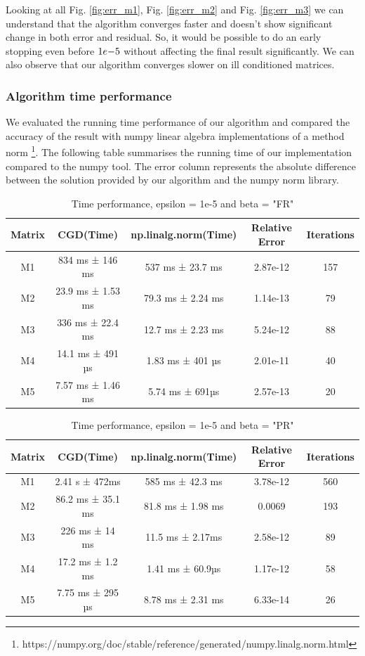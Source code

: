 \documentclass{article}
\numberwithin{equation}{section}
\begin{document}
Looking at all Fig. \ref{fig:err_m1}, Fig. \ref{fig:err_m2} and Fig. \ref{fig:err_m3} we can understand that the algorithm converges faster and doesn't show significant change in both error and residual. So, it would be possible to do an early stopping even before $1e\-{-5}$ without affecting the final result significantly. We can also observe that our algorithm converges slower on ill conditioned matrices.
\subsubsection{Algorithm time performance}
We evaluated the running time performance of our algorithm and compared the accuracy of the result with numpy linear algebra implementations of a method norm \footnote{https://numpy.org/doc/stable/reference/generated/numpy.linalg.norm.html}. The following table summarises the running time of our implementation compared to the numpy tool. The error column represents the absolute difference between the solution provided by our algorithm and the numpy norm library.

\begin{table}[hbt!]
    \centering
    \begin{tabular}{||c c c c c||}
 \hline
 Matrix & CGD(Time) & np.linalg.norm(Time) & Relative Error & Iterations \\ [0.8ex] 
 \hline\hline
 M1 & 834 ms ± 146 ms & 537 ms ± 23.7 ms & 2.87e-12 & 157 \\
 
 \hline
 M2 & 23.9 ms ± 1.53 ms & 79.3 ms ± 2.24 ms & 1.14e-13 & 79\\
 \hline
 M3 & 336 ms ± 22.4 ms & 12.7 ms ± 2.23 ms & 5.24e-12 & 88 \\
 \hline
 M4 & 14.1 ms ± 491 µs & 1.83 ms ± 401 µs & 2.01e-11 & 40 \\
 \hline
 M5 & 7.57 ms ± 1.46 ms & 5.74 ms ± 691µs & 2.57e-13 & 20 \\
 \hline
\end{tabular}
    \caption{Time performance, epsilon = 1e-5 and beta = "FR"}
    \label{tab:fr_table}
\end{table}


\begin{table}[hbt!]
    \centering
    \begin{tabular}{||c c c c c||}
 \hline
 Matrix & CGD(Time) & np.linalg.norm(Time) & Relative Error & Iterations \\ [0.8ex] 
 \hline\hline
 M1 & 2.41 s ± 472ms & 585 ms ± 42.3 ms & 3.78e-12 & 560\\ 
 \hline
 M2 & 86.2 ms ± 35.1 ms & 81.8 ms ± 1.98 ms & 0.0069 & 193\\
 \hline
 M3 & 226 ms ± 14 ms & 11.5 ms ± 2.17ms  & 2.58e-12 & 89  \\
 \hline
 M4 & 17.2 ms ± 1.2 ms & 1.41 ms ± 60.9µs & 1.17e-12 & 58 \\
 \hline
  M5 & 7.75 ms ± 295 µs & 8.78 ms ± 2.31 ms & 6.33e-14 & 26 \\
 \hline
\end{tabular}
    \caption{Time performance, epsilon = 1e-5 and beta = "PR"}
    \label{tab:pr_table}
\end{table}
\end{document}
